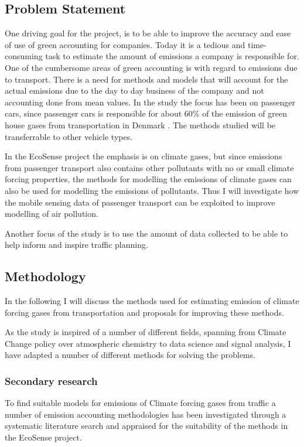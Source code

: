 \subsection{Problem Statement}
One driving goal for the project, is to be able to improve the accuracy and ease of use of green accounting for companies. Today it is a tedious and time-consuming task to estimate the amount of emissions a company is responsible for. One of the cumbersome areas of green accounting is with regard to emissions due to transport. There is a need for methods and models that will account for the actual emissions due to the day to day business of the company and not accounting done from mean values. In the study the focus has been on passenger cars, since passenger cars is responsible for about 60\% of the emission of green house gases from transportation in Denmark \cite{nielsen2014}. The methods studied will be transferrable to other vehicle types.

In the EcoSense project the emphasis is on climate gases, but since emissions from passenger transport also contains other pollutants with no or small climate forcing properties, the methods for modelling the emissions of climate gases can also be used for modelling the emissions of pollutants. Thus I will investigate how the mobile sensing data of passenger transport can be exploited to improve modelling of air pollution.

Another focus of the study is to use the amount of data collected to be able to help inform and inspire traffic planning.


\subsection{Methodology}
In the following I will discuss the methods used for estimating emission of climate forcing gases from transportation and proposals for improving these methods.

As the study is inspired of a number of different fields, spanning from Climate Change policy over atmospheric chemistry to data science and signal analysis, I have adapted a number of different methods for solving the problems. 

\subsubsection{Secondary research}
To find suitable models for emissions of Climate forcing gases from traffic a number of emission accounting methodologies has been investigated through a systematic literature search and appraised for the suitability of the methods in the EcoSense project.

